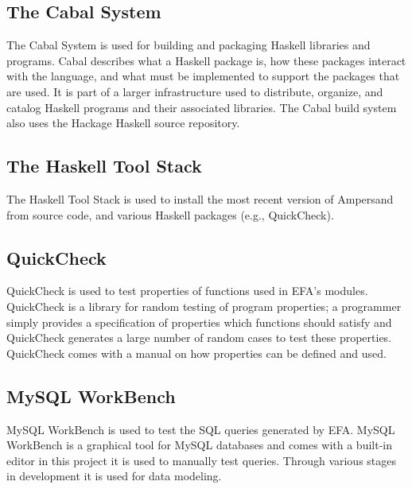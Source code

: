 \documentclass[journal,12pt,onecolumn,draftclsnofoot]{report}
\let\Oldsubsection\subsection
\renewcommand{\subsection}{\FloatBarrier\Oldsubsection}
\begin{document}
\subsection*{The Cabal System}

 

The Cabal System \cite{cabalsys} is used for building 
and packaging Haskell libraries and programs. 
Cabal describes what a Haskell package is, how these packages interact with the 
language, and what must be implemented to support the packages that are used. 
It is part of a larger infrastructure used to distribute, organize, and catalog 
Haskell programs and their associated libraries. The Cabal build system
also uses the Hackage \cite{hackage} Haskell source repository.

\subsection*{The Haskell Tool Stack}

The Haskell Tool Stack \cite{cabalsys} is used to 
install the most recent version of \gls{Ampersand} from source code, and various 
Haskell packages (e.g., QuickCheck).

\subsection*{QuickCheck}

QuickCheck \cite{quickCheck} is used to 
test properties of functions used in EFA's modules. QuickCheck is a library for 
random testing of program properties; a programmer simply provides a 
specification of properties which functions should satisfy
and QuickCheck generates a large number of random cases to test these properties.
QuickCheck comes with a manual on how 
properties can be defined and used. 

\subsection*{MySQL WorkBench}

MySQL WorkBench \cite{workbench} is used to test 
the SQL queries generated by EFA. MySQL WorkBench is a graphical tool for MySQL 
databases and comes with a built-in editor in this project it is used to 
manually test queries. Through various stages in development it is used for 
data modeling.
\end{document}
